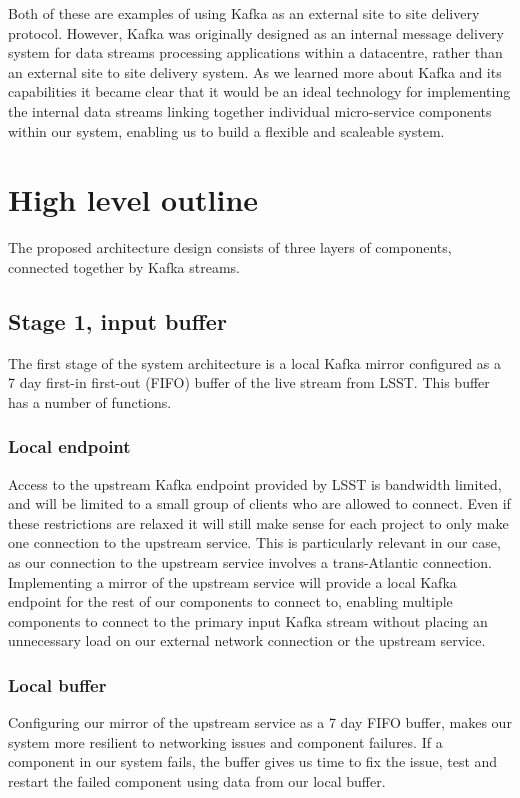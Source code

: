 \documentclass{article}
\newcommand{\scaleable} {scaleable\xspace}
\newcommand{\datacentre} {datacentre\xspace}
\newcommand{\kafka} {Kafka\xspace}
\newcommand{\fifo} {FIFO\xspace}
\newcommand{\lsst} {LSST\xspace}
\begin{document}
Both of these are examples of using \kafka as an external site to site delivery protocol.
However, \kafka was originally designed as an internal message delivery system for data streams processing applications within a \datacentre, rather than an external site to site delivery system.
As we learned more about \kafka and its capabilities it became clear that it would be an ideal technology for implementing the internal data streams linking together individual micro-service components within our system, enabling us to build a flexible and \scaleable system.

\section{High level outline}
\label{high-level-outline}

The proposed architecture design consists of three layers of components, connected together by \kafka streams.

\subsection{Stage 1, input buffer}
\label{stage-1}

The first stage of the system architecture is a local \kafka mirror configured as a 7 day first-in first-out (\fifo) buffer of the live stream from \lsst. This buffer has a number of functions.

\subsubsection{Local endpoint}
\label{stage-1.local-endpoint}
Access to the upstream \kafka endpoint provided by \lsst is bandwidth limited, and will be limited to a small group of clients who are allowed to connect. Even if these restrictions are relaxed it will still make sense for each project to only make one connection to the upstream service.
This is particularly relevant in our case, as our connection to the upstream service involves a trans-Atlantic connection.
Implementing a mirror of the upstream service will provide a local \kafka endpoint for the rest of our components to connect to, enabling multiple components to connect to the primary input \kafka stream without placing an unnecessary load on our external network connection or the upstream service.

\subsubsection{Local buffer}
\label{stage-1.local-buffer}
Configuring our mirror of the upstream service as a 7 day \fifo buffer, makes our system more resilient to networking issues and component failures.
If a component in our system fails, the buffer gives us time to fix the issue, test and restart the failed component using data from our local buffer.
\end{document}
